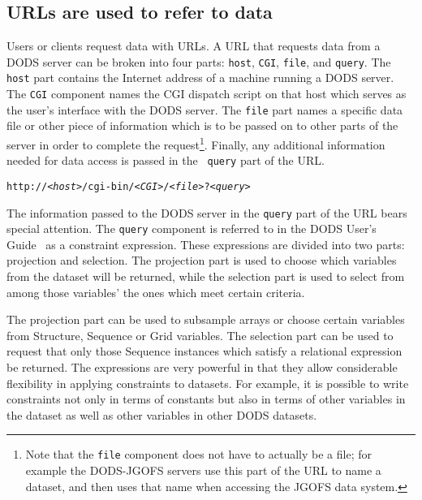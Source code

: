 \documentclass{article}
\begin{document}
\subsection{URLs are used to refer to data}
\label{url}


Users or clients request data with \acs{URL}s. A \acs{URL} that requests data
from a \ac{DODS} server can be broken into four parts: {\tt host}, {\tt CGI},
{\tt file}, and {\tt query}. The {\tt host} part contains the Internet
address of a machine running a \ac{DODS} server.  The {\tt CGI} component
names the CGI dispatch script on that host which serves as the user's
interface with the \ac{DODS} server. The {\tt file} part names a specific
data file or other piece of information which is to be passed on to other
parts of the server in order to complete the request\footnote{Note that the
  {\tt file} component does not have to actually be a file; for example the
  \ac{DODS}-JGOFS servers use this part of the \acs{URL} to name a dataset,
  and then uses that name when accessing the JGOFS data system.}.  Finally,
any additional information needed for data access is passed in the {\tt
  query} part of the \acs{URL}.

\begin{alltt}
    http://\emph{<host>}/cgi-bin/\emph{<CGI>}/\emph{<file>}?\emph{<query>}
\end{alltt}

The information passed to the \ac{DODS} server in the {\tt query} part of the
\acs{URL} bears special attention. The {\tt query} component is referred to
in the \ac{DODS} User's Guide~\cite{dods:users-guide} as a constraint
expression. These expressions are divided into two parts: projection and
selection. The projection part is used to choose which variables from the
dataset will be returned, while the selection part is used to select from
among those variables' the ones which meet certain criteria.

The projection part can be used to subsample arrays or choose certain
variables from Structure, Sequence or Grid variables. The selection part can
be used to request that only those Sequence instances which satisfy a
relational expression be returned. The expressions are very powerful in that
they allow considerable flexibility in applying constraints to datasets. For
example, it is possible to write constraints not only in terms of constants
but also in terms of other variables in the dataset as well as other
variables in other \ac{DODS} datasets.
\end{document}
